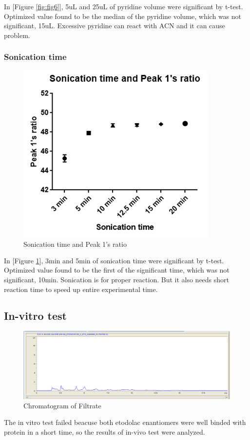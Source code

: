 \documentclass[12pt]{article} %
\begin{document}
 In [Figure \ref{fig:fig6}],  5uL and 25uL of pyridine volume were significant by t-test. Optimized value found to be the median of the pyridine volume, which was not significant, 15uL. Excessive pyridine can react with ACN and it can cause problem.

\subsubsection {Sonication time}

\begin{figure}[h!]
  \centering
  \includegraphics[width=0.6\linewidth]{fig7.png}
  \caption{Sonication time and Peak 1's ratio}
  \label{fig:fig7}
\end{figure}
  In [Figure \ref{fig:fig7}],  3min and 5min of sonication time were significant by t-test. Optimized value found to be the first of the significant time, which was not significant, 10min. Sonication is for proper reaction. But it also needs short reaction time to speed up entire experimental time.



\subsection {In-vitro test}
\begin{figure}[h!]
  \centering
  \includegraphics[width=\linewidth]{fig8.png}
  \caption{Chromatogram of Filtrate}
  \label{fig:fig9}
\end{figure}
 The in vitro test failed beacuse both etodolac enantiomers were well binded with protein in a short time, so the results of in-vivo test were analyzed.
\end{document}
